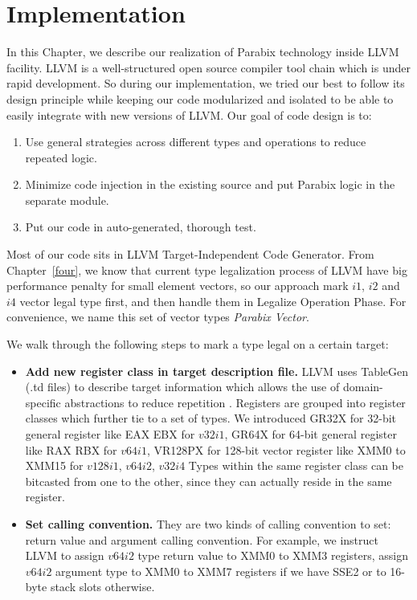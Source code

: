 %
%

\chapter{Implementation}
\label{five}

In this Chapter, we describe our realization of Parabix technology inside LLVM facility. LLVM is a well-structured open source compiler tool chain which is under rapid development. So during our implementation, we tried our best to follow its design principle while keeping our code modularized and isolated to be able to easily integrate with new versions of LLVM\@. Our goal of code design is to:
\begin{enumerate}
  \item Use general strategies across different types and operations to reduce repeated logic.
  \item Minimize code injection in the existing source and put Parabix logic in the separate module.
  \item Put our code in auto-generated, thorough test.
\end{enumerate}

Most of our code sits in LLVM Target-Independent Code Generator\cite{llvm_code_gen}. From Chapter~\ref{four}, we know that current type legalization process of LLVM have big performance penalty for small element vectors, so our approach mark $i1$, $i2$ and $i4$ vector legal type first, and then handle them in Legalize Operation Phase. For convenience, we name this set of vector types \textit{Parabix Vector}.

We walk through the following steps to mark a type legal on a certain target:
\begin{itemize}
  \item \textbf{Add new register class in target description file.} LLVM uses TableGen (.td files) to describe target information which allows the use of domain-specific abstractions to reduce repetition \cite{llvm_code_gen}. Registers are grouped into register classes which further tie to a set of types. We introduced GR32X for 32-bit general register like EAX EBX for $v32i1$, GR64X for 64-bit general register like RAX RBX for $v64i1$, VR128PX for 128-bit vector register like XMM0 to XMM15 for $v128i1$, $v64i2$, $v32i4$  Types within the same register class can be bitcasted from one to the other, since they can actually reside in the same register.

  \item \textbf{Set calling convention.} They are two kinds of calling convention to set: return value and argument calling convention. For example, we instruct LLVM to assign $v64i2$ type return value to XMM0 to XMM3 registers, assign $v64i2$ argument type to XMM0 to XMM7 registers if we have SSE2 or to 16-byte stack slots otherwise.
\end{itemize}

